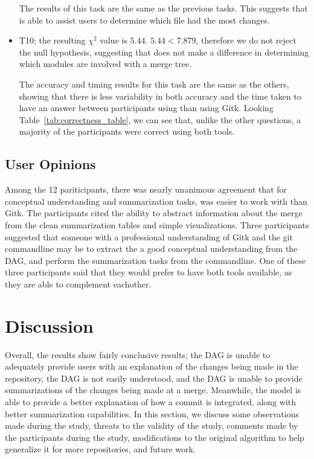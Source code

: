 \documentclass[draft]{IEEEtran}
\begin{document}
\begin{itemize}
    The results of this task are the same as the previous tasks.
    This suggests that \tool is able to assist users to determine which
    file had the most changes.

  \item

    T10; the resulting $\chi^2$ value is $5.44$. $5.44 < 7.879$,
    therefore we do not reject the null hypothesis, suggesting that
    \tool does not make a difference in determining which modules are
    involved with a merge tree.

    The accuracy and timing results for this task are the same as the
    others, showing that there is less variability in both accuracy and
    the time taken to have an answer between participants using \tool
    than using Gitk. Looking Table~\ref{tab:correctness_table}, we can
    see that, unlike the other questions, a majority of the participants
    were correct using both tools.

\end{itemize}

\subsection{User Opinions}
\label{sub:user_opinions}

Among the 12 pariticipants, there was nearly unanimous agreement that
for conceptual understanding and summarization tasks, \tool was easier
to work with than Gitk. The participants cited the ability to abstract
information about the merge from the clean summarization tables and
simple visualizations. Three participants suggested that someone with a
professional understanding of Gitk and the git commandline may be to
extract the a good conceptual understanding from the DAG, and perform
the summarization tasks from the commandline. One of these three
participants said that they would prefer to have both tools available,
as they are able to complement eachother.

\section{Discussion}
\label{sec:discussion}

Overall, the results show fairly conclusive results; the DAG is unable
to adequately provide users with an explanation of the changes being
made in the repository, the DAG is not easily understood, and the DAG is
unable to provide summarizations of the changes being made at a merge.
Meanwhile, the \mt model is able to provide a better explanation of how
a commit is integrated, along with better summarization capabilities. In
this section, we discuss some observations made during the study,
threats to the validity of the study, comments made by the participants
during the study, modifications to the original algorithm to help
generalize it for more repositories, and future work.
\end{document}
